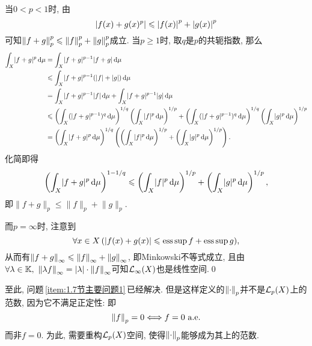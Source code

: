 \begin{Proof}
	当$ 0<p<1 $时, 由
	\[
		\left| f(x)+g(x)^p \right| \leqslant\left| f(x) \right| ^p+\left| g(x) \right| ^p
	\]
	可知$ \left\| f+g \right\|_p^p\leqslant \left\| f \right\|_p^p+\left\| g \right\|_p^p $成立. 当$ p\geqslant 1 $时, 取$ q $是$ p $的共轭指数, 那么
	\begin{align*}
		\int_X\lvert f+g\rvert^p\,\mathrm{d}\mu & =\int_X\lvert f+g\rvert^{p-1}\lvert f+g\rvert\,\mathrm{d}\mu                                                                                                                                                                                  \\
		                                 & \leqslant\int_X\lvert f+g\rvert^{p-1}(\lvert f\rvert+\lvert g\rvert)\,\mathrm{d}\mu                                                                                                                                                           \\
		                                 & =\int_X\lvert f+g\rvert^{p-1}\lvert f\rvert\,\mathrm{d}\mu+\int_X\lvert f+g\rvert^{p-1}\lvert g\rvert\,\mathrm{d}\mu                                                                                                                                 \\
		                                 & \leqslant\left( \int_X(\lvert f+g\rvert^{p-1})^q\,\mathrm{d}\mu \right)^{1/q}\left(\int_X\lvert f\rvert^p\,\mathrm{d}\mu\right)^{1/p}+\left( \int_X(\lvert f+g\rvert^{p-1})^q\,\mathrm{d}\mu \right)^{1/q}\left(\int_X\lvert g\rvert^p\,\mathrm{d}\mu\right)^{1/p} \\
		                                 & =\left( \int_X\lvert f+g\rvert^p\,\mathrm{d}\mu \right)^{1/q}\left( \left( \int_X\lvert f\rvert^p\,\mathrm{d}\mu \right)^{1/p}+\left( \int_X\lvert g\rvert^p\,\mathrm{d}\mu \right)^{1/p} \right).
	\end{align*}
	化简即得
	\[
		\left( \int_X\lvert f+g\rvert^p\,\mathrm{d}\mu \right)^{1-1/q}\leqslant\left( \int_X\lvert f\rvert^p\,\mathrm{d}\mu \right)^{1/p}+\left( \int_X\lvert g\rvert^p\,\mathrm{d}\mu \right)^{1/p},
	\]
	即$ \lVert f+g\rVert_p\leqslant\lVert f\rVert_p+\lVert g\rVert_p $.

	而$ p=\infty $时, 注意到
	\[
		\forall x\in X\,(\left| f(x)+g(x) \right| \leqslant\operatorname{ess\,sup} f+\operatorname{ess\,sup} g),
	\]
	从而有$ \left\| f+g \right\|_\infty\leqslant\left\| f \right\|_\infty+\left\| g \right\|_\infty $, 即Minkowski不等式成立, 且由$ \forall\lambda\in\mathbb{K},\ \left\| \lambda f \right\|_\infty=\left| \lambda \right| \cdot\left\| f \right\|_\infty $可知$ \mathcal{L}_\infty(X) $也是线性空间.\qed
\end{Proof}

至此, 问题\,\ref{item:1.7节主要问题1}\,已经解决. 但是这样定义的$ \left\| \cdot \right\|_p $并不是$ \mathcal{L}_p(X) $上的范数, 因为它不满足正定性: 即
\[
	\norm{f}_p=0\Longleftrightarrow f=0\ \text{a.e.}
\]
而非$ f=0 $. 为此, 需要重构$ \mathcal{L}_p(X) $空间, 使得$ \left\| \cdot \right\|_p $能够成为其上的范数.

